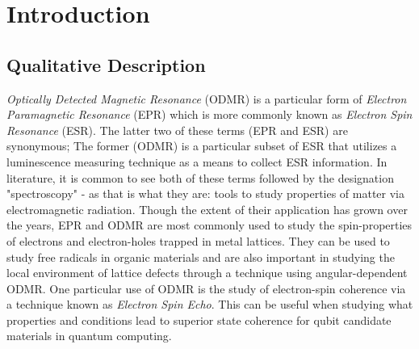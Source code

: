 \documentclass[oneside, astronomy, noacknowlegments]{BYUPhys}
\begin{document}
 \frontmatter

 \makepreliminarypages

 \tableofcontents

 \mainmatter

\listoffigures 


\chapter{Introduction}

\section{Qualitative Description}
\label{sec:qualitative}

\textit{Optically Detected Magnetic Resonance} (ODMR) is a particular form of \textit{Electron Paramagnetic Resonance} (EPR) which is more commonly known as \textit{Electron Spin Resonance} (ESR). The latter two of these terms (EPR and ESR) are synonymous; The former (ODMR) is a particular subset of ESR that utilizes a luminescence measuring technique as a means to collect ESR information. In literature, it is common to see both of these terms followed by the designation "spectroscopy" - as that is what they are: tools to study properties of matter via electromagnetic radiation. Though the extent of their application has grown over the years, EPR and ODMR are most commonly used to study the spin-properties of electrons and electron-holes trapped in metal lattices. They can be used to study free radicals in organic materials and are also important in studying the local environment of lattice defects through a technique using angular-dependent ODMR. One particular use of ODMR is the study of electron-spin coherence via a technique known as \textit{Electron Spin Echo}. This can be useful when studying what properties and conditions lead to superior state coherence for qubit candidate materials in quantum computing.
\end{document}
